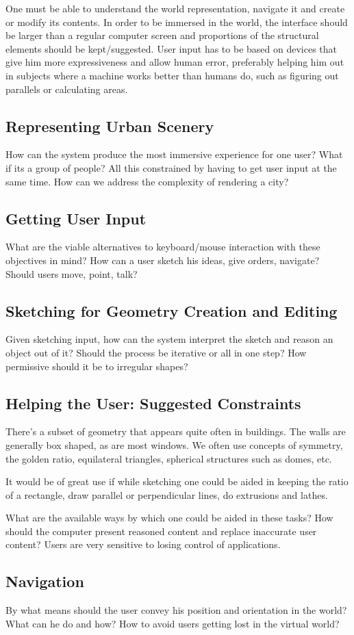 One must be able to understand the world representation, navigate it and create or modify its contents.
In order to be immersed in the world, the interface should be larger than a regular computer screen
and proportions of the structural elements should be kept/suggested.
User input has to be based on devices that give him more expressiveness and allow human error,
preferably helping him out in subjects where a machine works better than humans do,
such as figuring out parallels or calculating areas.


\subsection{Representing Urban Scenery}
How can the system produce the most immersive experience for one user?
What if its a group of people? All this constrained by having to get user input at the same time.
How can we address the complexity of rendering a city?


\subsection{Getting User Input}
What are the viable alternatives to keyboard/mouse interaction with these objectives in mind?
How can a user sketch his ideas, give orders, navigate? Should users move, point, talk?


\subsection{Sketching for Geometry Creation and Editing}
Given sketching input, how can the system interpret the sketch and reason an object
out of it? Should the process be iterative or all in one step? How permissive should
it be to irregular shapes?
 

\subsection{Helping the User: Suggested Constraints}
There's a subset of geometry that appears quite often in buildings.
The walls are generally box shaped, as are most windows. We often use concepts of symmetry,
the golden ratio, equilateral triangles, spherical structures such as domes, etc.

It would be of great use if while sketching one could be aided in keeping the ratio of
a rectangle, draw parallel or perpendicular lines, do extrusions and lathes.

What are the available ways by which one could be aided in these tasks?
How should the computer present reasoned content and replace inaccurate user content?
Users are very sensitive to losing control of applications.


\subsection{Navigation}
By what means should the user convey his position and orientation in the world?
What can he do and how? How to avoid users getting lost in the virtual world?

